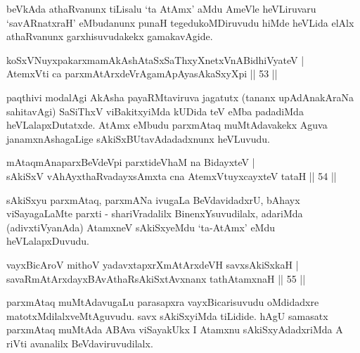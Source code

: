 
\begin{artha}
 beVkAda athaRvanunx tiLisalu `ta AtAmx' aMdu AmeVle heVLiruvaru `savARnatxraH' eMbudanunx punaH tegedukoMDiruvudu hiMde heVLida elAlx athaRvanunx garxhisuvudakekx gamakavAgide.
\end{artha}


\begin{shl}
koSxVNuyxpakarxmamAkAshAtaSxSaThxyXnetxVnABidhiVyateV |\\
AtemxVti ca parxmAtArxdeVrAgamApAyasAkaSxyXpi \hfill || 53 ||
\end{shl}

\begin{artha}
paqthivi modalAgi AkAsha payaRMtaviruva jagatutx (tananx upAdAnakAraNa sahitavAgi) SaSiThxV viBakitxyiMda kUDida teV eMba padadiMda heVLalapxDutatxde. AtAmx eMbudu parxmAtaq muMtAdavakekx Aguva janamxnAshagaLige sAkiSxBUtavAdadadxnunx heVLuvudu. 
\end{artha}


\begin{shl}
mAtaqmAnaparxBeVdeV\s pi parxtideVhaM na BidayxteV |\\
sAkiSxV vAhAyxthaRvadayxsAmxta cna AtemxVtuyxcayxteV tataH \hfill || 54 ||
\end{shl}

\begin{artha}
sAkiSxyu parxmAtaq, parxmANa ivugaLa BeVdavidadxrU, bAhayx viSayagaLaMte parxti - shariVradalilx BinenxYsuvudilalx, adariMda (adivxtiVyanAda) AtamxneV sAkiSxyeMdu `ta-AtAmx' eMdu heVLalapxDuvudu.
\end{artha}

\begin{shl}
vayxBicAroV mithoV yadavxtapxrXmAtArxdeVH savxsAkiSxkaH |\\
savaRmAtArxdayxBAvAthaRsAkiSxtAvxnanx tathA\s \s tamxnaH \hfill || 55 ||
\end{shl}

\begin{artha}
parxmAtaq muMtAdavugaLu parasapxra vayxBicarisuvudu oMdidadxre matotxMdilalxveMtAguvudu. savx sAkiSxyiMda tiLidide. hAgU samasatx parxmAtaq muMtAda ABAva viSayakUkx I Atamxnu sAkiSxyAdadxriMda A riVti avanalilx BeVdaviruvudilalx.
\end{artha}

